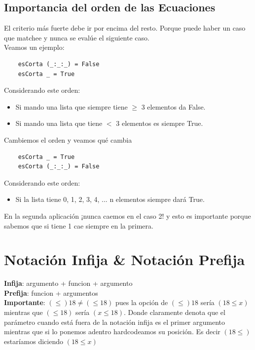 \documentclass[10pt,a4paper]{article}
\begin{document}
\subsection*{Importancia del orden de las Ecuaciones}
El criterio más fuerte debe ir por encima del resto. Porque puede haber un caso que matchee y nunca se evalúe el siguiente caso. \\
Veamos un ejemplo: 
\begin{lstlisting}
    esCorta (_:_:_) = False
    esCorta _ = True 
\end{lstlisting}

Considerando este orden: 
\begin{itemize}
    \item Si mando una lista que siempre tiene $\ge$ 3 elementos da False.
    \item Si mando una lista que tiene $ < $ 3 elementos es siempre True.
\end{itemize}

Cambiemos el orden y veamos qué cambia
\begin{lstlisting}
    esCorta _ = True 
    esCorta (_:_:_) = False
\end{lstlisting}
Considerando este orden: 
\begin{itemize}
    \item Si la lista tiene 0, 1, 2, 3, 4, ... n elementos siempre dará True.
\end{itemize}
En la segunda aplicación ¡nunca caemos en el caso 2! y esto es importante porque sabemos que si tiene 1 cae siempre en la primera.
\section*{Notación Infija \& Notación Prefija}
\textbf{Infija}: argumento + funcion + argumento \\
\textbf{Prefija}: funcion + argumentos \\
\textbf{Importante}: $(\le) 18 \neq (\le 18)$ pues la opción de $(\le) 18$ sería $(18 \le x)$ mientras que $(\le 18)$ sería $(x \le 18)$. Donde claramente denota que el parámetro cuando está fuera de la notación infija es el primer argumento mientras que si lo ponemos adentro hardcodeamos su posición. Es decir $(18 \le)$ estaríamos diciendo $(18 \le x)$
\end{document}
